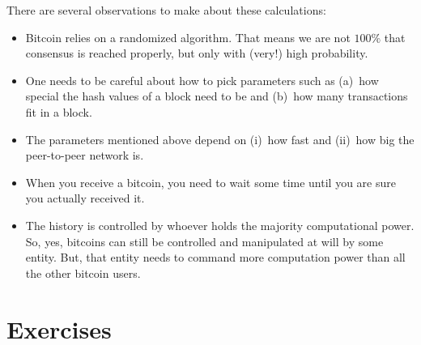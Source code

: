 There are several observations to make about these calculations:
\begin{itemize}
\item
  Bitcoin relies on a randomized algorithm.
  That means we are not $100\%$ that consensus is reached properly, but only with (very!) high probability.
\item
  One needs to be careful about how to pick parameters such as (a)~how special the hash values of a block need to be and (b)~how many transactions fit in a block.
\item
  The parameters mentioned above depend on (i)~how fast and (ii)~how big the peer-to-peer network is.
\item
  When you receive a bitcoin, you need to wait some time until you are sure you actually received it.
\item
  The history is controlled by whoever holds the majority computational power.
  So, yes, bitcoins can still be controlled and manipulated at will by some entity.
  But, that entity needs to command more computation power than all the other bitcoin users.
\end{itemize}


\section{Exercises}


